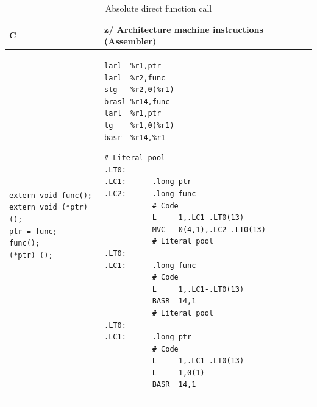\documentclass[USenglish,fontsize=11pt,twoside,%
  toc=bib,toc=idx,toc=graduated,numbers=noendperiod,
  bookmarks=true,
  bookmarksnumbered=true,
  bookmarksopen=true,
  bookmarksopenlevel=1,
  breaklinks=true,
  colorlinks=true,
  linkcolor=black,
  pdfpagelayout={TwoPageRight},
  pdfusetitle=true
]{scrreprt}
\newcommand{\ARCH}{z/\kern-1pt Ar\-chi\-tec\-ture}
\newcommand{\ARCH}{ESA/390}
\newenvironment{DIFnomarkup}{}{} %
\begin{document}
\begin{table}
  \centering
  \begin{DIFnomarkup}
  \begin{tabular}{p{}p{}}
    \toprule
    C & \ARCH{} machine instructions (Assembler) \\
    \midrule
\begin{lstlisting}[style=short]
extern void func();
extern void (*ptr)();
ptr = func;
func();
(*ptr) ();
\end{lstlisting}
    &
\ifzseries
\begin{lstlisting}[style=short,language=simpleasm]
larl  %r1,ptr
larl  %r2,func
stg   %r2,0(%r1)
brasl %r14,func
larl  %r1,ptr
lg    %r1,0(%r1)
basr  %r14,%r1
\end{lstlisting}
\else
\begin{lstlisting}[style=short,language=simpleasm]
           # Literal pool
.LT0:
.LC1:      .long ptr
.LC2:      .long func
           # Code
           L     1,.LC1-.LT0(13)
           MVC   0(4,1),.LC2-.LT0(13)
           # Literal pool
.LT0:
.LC1:      .long func
           # Code
           L     1,.LC1-.LT0(13)
           BASR  14,1
           # Literal pool
.LT0:
.LC1:      .long ptr
           # Code
           L     1,.LC1-.LT0(13)
           L     1,0(1)
           BASR  14,1
\end{lstlisting}
\fi \\
    \bottomrule
  \end{tabular}
  \end{DIFnomarkup}
  \caption{Absolute {\ifzseries\else direct\fi} function call}
  \label{tab:fncalldirect}
\end{table}
\end{document}
